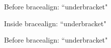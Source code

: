 \documentclass{article}
\begin{document}
\begin{dispExample}
  Before \textsf{bracealign}:\newline
  ``\expandafter\meaning\csname underbracket\endcsname"
  \par\bigskip
  \begin{bracealign}
    Inside \textsf{bracealign}:\newline
    ``\expandafter\meaning\csname underbracket\endcsname"
  \end{bracealign}
  \par\bigskip
  Before \textsf{bracealign}:\newline
  ``\expandafter\meaning\csname underbracket\endcsname"
\end{dispExample}
\end{document}
